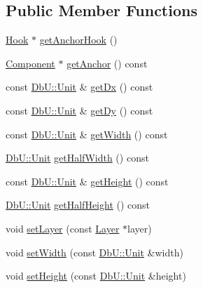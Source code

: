 \subsection*{Public Member Functions}
\begin{DoxyCompactItemize}
\item 
\hyperlink{classHurricane_1_1Hook}{Hook} $\ast$ \hyperlink{classHurricane_1_1Contact_a300306b006397377bc9a54ea783c1150}{get\+Anchor\+Hook} ()
\item 
\hyperlink{classHurricane_1_1Component}{Component} $\ast$ \hyperlink{classHurricane_1_1Contact_ab0b327b306bf7ebda634f59d8d0cfd8f}{get\+Anchor} () const
\item 
const \hyperlink{group__DbUGroup_ga4fbfa3e8c89347af76c9628ea06c4146}{Db\+U\+::\+Unit} \& \hyperlink{classHurricane_1_1Contact_acf8405f74b97239ea74ec629d0b4e194}{get\+Dx} () const
\item 
const \hyperlink{group__DbUGroup_ga4fbfa3e8c89347af76c9628ea06c4146}{Db\+U\+::\+Unit} \& \hyperlink{classHurricane_1_1Contact_aa7bc32ab9211fd5f6ad3aacdf1214f20}{get\+Dy} () const
\item 
const \hyperlink{group__DbUGroup_ga4fbfa3e8c89347af76c9628ea06c4146}{Db\+U\+::\+Unit} \& \hyperlink{classHurricane_1_1Contact_a28bd18de9ca6e5cf2b77fce5e22af43a}{get\+Width} () const
\item 
\hyperlink{group__DbUGroup_ga4fbfa3e8c89347af76c9628ea06c4146}{Db\+U\+::\+Unit} \hyperlink{classHurricane_1_1Contact_a4a5136f4e8299435e50db7da28172ca1}{get\+Half\+Width} () const
\item 
const \hyperlink{group__DbUGroup_ga4fbfa3e8c89347af76c9628ea06c4146}{Db\+U\+::\+Unit} \& \hyperlink{classHurricane_1_1Contact_adf6487485a4f48bd15aa6f9a8ac5fd27}{get\+Height} () const
\item 
\hyperlink{group__DbUGroup_ga4fbfa3e8c89347af76c9628ea06c4146}{Db\+U\+::\+Unit} \hyperlink{classHurricane_1_1Contact_aebd3ff8e1368617ab750b20ae9ffb59b}{get\+Half\+Height} () const
\item 
void \hyperlink{classHurricane_1_1Contact_a147644849f33bc4d58b6b997543c8306}{set\+Layer} (const \hyperlink{classHurricane_1_1Layer}{Layer} $\ast$layer)
\item 
void \hyperlink{classHurricane_1_1Contact_aae6d5c96862fd6c834ff4abd61edc86f}{set\+Width} (const \hyperlink{group__DbUGroup_ga4fbfa3e8c89347af76c9628ea06c4146}{Db\+U\+::\+Unit} \&width)
\item 
void \hyperlink{classHurricane_1_1Contact_a2fc2e7c85dc5495810544c48bb604712}{set\+Height} (const \hyperlink{group__DbUGroup_ga4fbfa3e8c89347af76c9628ea06c4146}{Db\+U\+::\+Unit} \&height)

\end{DoxyCompactItemize}
